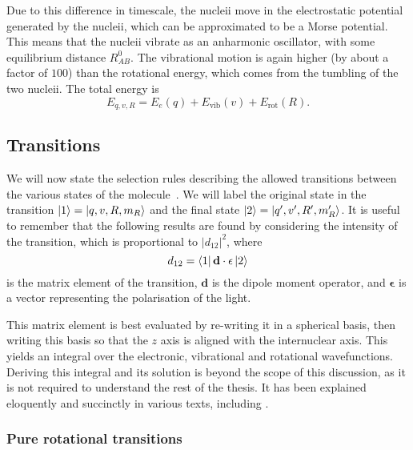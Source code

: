 Due to this difference in timescale, the nucleii move in the electrostatic potential
generated by the nucleii, which can be approximated to be a Morse potential. This
means that the nucleii vibrate as an anharmonic oscillator, with some
equilibrium distance $R_{AB}^0$. The vibrational motion is again higher (by
about a factor of $100$) than the rotational energy, which comes from the
tumbling of the two nucleii. The total energy is
%
\begin{equation}
  E_{q,v,R} = E_e(q) + E_\text{vib}(v) + E_\text{rot}(R).
\end{equation}


\subsection{Transitions}
\label{theory:transitions}


We will now state the selection rules describing the allowed transitions
between the various states of the molecule~\cite{brown_carrington_2003}. We
will label the original state in the transition $\ket{1} = \ket{q, v, R, m_R}$
and the final state $\ket{2} = \ket{q', v', R', m_R'}$.
%
It is useful to remember that the following results are found by considering
the intensity of the transition, which is proportional to $|d_{12}|^2$, where
%
\begin{equation}
  d_{12} = \bra{1}\mathbf{d}\cdot\mathbf{\epsilon}\ket{2}
\end{equation}
%
is the matrix element of the transition, $\mathbf{d}$ is the dipole moment 
operator, and $\mathbf{\epsilon}$ is a vector representing the polarisation of
the light.

This matrix element is best evaluated by re-writing it in a spherical basis,
then writing this basis so that the $z$ axis is aligned with the internuclear
axis. This yields an integral over the electronic, vibrational and rotational
wavefunctions. Deriving this integral and its solution is beyond the scope of
this discussion, as it is not required to understand the rest of the thesis. It
has been explained eloquently and succinctly in various texts, including
.

\subsubsection{Pure rotational transitions}

